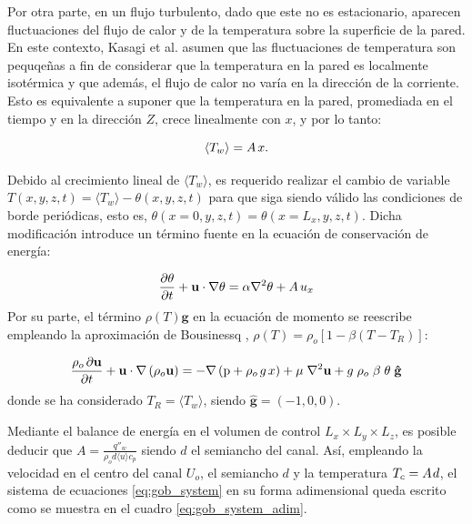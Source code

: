 Por otra parte, en un flujo turbulento, dado que este no es estacionario, aparecen fluctuaciones del flujo de calor y de la temperatura sobre la superficie de la pared. En este contexto, Kasagi et al. \cite{kasagi1992direct} asumen que las fluctuaciones de temperatura son pequqeñas a fin de considerar que la temperatura en la pared es localmente isotérmica y que además, el flujo de calor no varía en la dirección de la corriente. Esto es equivalente a suponer que la temperatura en la pared, promediada en el tiempo y en la dirección $Z$, crece linealmente con $x$, y por lo tanto: 

$$
\langle T_w \rangle = A \hspace{0.5mm} x.
$$

Debido al crecimiento lineal de $\langle T_w \rangle$, es requerido realizar el cambio de variable $T(x,y,z,t) = \langle T_w \rangle - \theta(x,y,z,t)$ para que siga siendo válido las condiciones de borde periódicas, esto es, $\theta(x=0,y,z,t)=\theta(x=L_x,y,z,t)$. Dicha modificación introduce un término fuente en la ecuación de conservación de energía:

\begin{equation}
\frac{ \partial \theta }{ \partial t } + \mathbf{u} \cdot \nabla \theta = \alpha \nabla^2 \theta + A \hspace{0.5mm} u_x 
\label{eq:energy_pcb_source}
\end{equation}
Por su parte, el término $\rho(T) \mathbf{g}$ en la ecuación de momento se reescribe empleando la aproximación de Bousinessq \cite{incropera}, $\rho(T) = \rho_o \left[ 1 - \beta (T - T_R) \right]$:

\begin{equation}
\frac{ \rho_o \hspace{0.5mm} \partial \mathbf{u}}{\partial t} + \mathbf{u} \cdot \nabla  \left( \rho_o \mathbf{u} \right) = -\nabla \left( \text{p} + \rho_o \hspace{0.5mm} g \hspace{0.5mm} x \right) + \mu \hspace{1mm} {\nabla}^2 \mathbf{u}  + g \hspace{1mm} \rho_o \hspace{1mm} \beta \hspace{1mm} \theta \hspace{1mm} \mathbf{\hat{g}}   
\end{equation}
donde se ha considerado $T_R = \langle T_w \rangle$, siendo $\mathbf{\hat{g}}=(-1,0,0)$.

Mediante el balance de energía en el volumen de control $L_x \times L_y \times L_z$, es posible deducir que $A = \frac{q''_w}{\rho_o  d \langle u \rangle c_p}$ siendo $d$ el semiancho del canal. Así, empleando la velocidad en el centro del canal $U_o$, el semiancho $d$ y la temperatura $T_c = A \hspace{0.3mm} d $, el sistema de ecuaciones \ref{eq:gob_system} en su forma adimensional queda escrito como se muestra en el cuadro \ref{eq:gob_system_adim}. 

